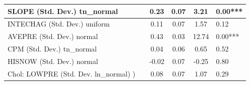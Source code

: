 \begin{table}
\begin{center}
\begin{tabular}{|l|l|c|c|c|l|}
			\hline
			SLOPE (Std. Dev.) tn_normal &  & 0.23 & 0.07 & 3.21 & 0.00*** \\
			\hline
			INTECHAG (Std. Dev.) uniform &  & 0.11 & 0.07 & 1.57 & 0.12 \\
			\hline
			AVEPRE (Std. Dev.) normal &  & 0.43 & 0.03 & 12.74 & 0.00*** \\
			\hline
			CPM (Std. Dev.) tn_normal &  & 0.04 & 0.06 & 0.65 & 0.52 \\
			\hline
			HISNOW (Std. Dev.) normal &  & -0.02 & 0.07 & -0.25 & 0.80 \\
			\hline
			 Chol: LOWPRE (Std. Dev. ln_normal) ) &  & 0.08 & 0.07 & 1.07 & 0.29 \\
			\hline
		\end{tabular}
	\end{center}
\end{table}